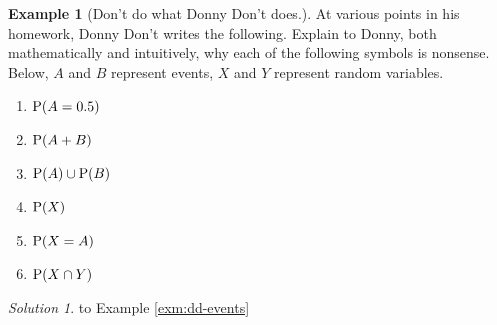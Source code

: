 \documentclass[
]{book}
\providecommand{\tightlist}{%
  \setlength{\itemsep}{0pt}\setlength{\parskip}{0pt}}
\theoremstyle{definition}
\theoremstyle{definition}
\newtheorem{example}{Example}[chapter]
\theoremstyle{definition}
\theoremstyle{remark}
\newtheorem*{solution}{Solution}
\begin{document}
\begin{example}[Don't do what Donny Don't does.]
\protect\hypertarget{exm:dd-events}{}{\label{exm:dd-events} {} }
At various points in his homework, Donny Don't writes the following. Explain to Donny, both mathematically and intuitively, why each of the following symbols is nonsense. Below, \(A\) and \(B\) represent events, \(X\) and \(Y\) represent random variables.
\end{example}

\begin{enumerate}
\def\labelenumi{\arabic{enumi}.}
\tightlist
\item
  \(\textrm{P}(A = 0.5)\)
\item
  \(\textrm{P}(A + B)\)
\item
  \(\textrm{P}(A) \cup \textrm{P}(B)\)
\item
  \(\textrm{P}(X)\)
\item
  \(\textrm{P}(X = A)\)
\item
  \(\textrm{P}(X \cap Y)\)
\end{enumerate}

\begin{solution}
{}to Example \ref{exm:dd-events}
\end{solution}
\end{document}

